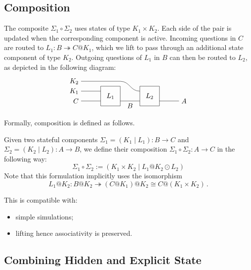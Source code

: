 \documentclass[acmsmall,screen,review,anonymous]{acmart}
\begin{document}

\subsection{Composition} %

The composite $\Sigma_1 \circ \Sigma_2$
uses states of type $K_1 \times K_2$.
Each side of the pair is updated
when the corresponding component is active.
Incoming questions in $C$ are routed to $L_1 : B \twoheadrightarrow C@K_1$,
which we lift to pass through an additional state component of type $K_2$.
Outgoing questions of $L_1$ in $B$ can then be routed to $L_2$,
as depicted in the following diagram:
\[
  \begin{tikzpicture}[yscale=0.5]
    \draw (0,2) node[left] {$K_2$} -- (2,2) .. controls +(0.5,0) and +(-0.5,0) .. (3,1);
    \draw (0,1) node[left] {$K_1$} -- (1,1);
    \draw (0,0) node[left] {$C$} -- (1,0);
    \draw (2,0) -- node[below] {$B$} (3,0);
    \draw (4,0) -- (5,0) node[right] {$A$};
    \draw (1,1.5) rectangle node {$L_1$} (2,-0.5);
    \draw (3,1.5) rectangle node {$L_2$} (4,-0.5);
  \end{tikzpicture}
\]
Formally,
composition is defined as follows.

\begin{definition}[Composition] \label{def:slcomp}
Given two stateful components
$\Sigma_1 = (K_1 \mid L_1) : B \rightarrow C$ and
$\Sigma_2 = (K_2 \mid L_2) : A \rightarrow B$,
we define their composition
$\Sigma_1 \circ \Sigma_2 : A \rightarrow C$
in the following way:
\[
  \Sigma_1 \circ \Sigma_2 :=
    ( K_1 \times K_2 \mid L_1@K_2 \odot L_2 )
\]
Note that this formulation
implicitly uses the isomorphism
\[
  L_1@K_2 : B@K_2 \twoheadrightarrow (C@K_1)@K_2 \cong C@(K_1 \times K_2)
  \,.
\]
\end{definition}




\begin{lemma}
  This is compatible with:
  \begin{itemize}
    \item simple simulations;
    \item lifting hence associativity is preserved.
  \end{itemize}

\end{lemma}


\subsection{Combining Hidden and Explicit State} %
\end{document}
